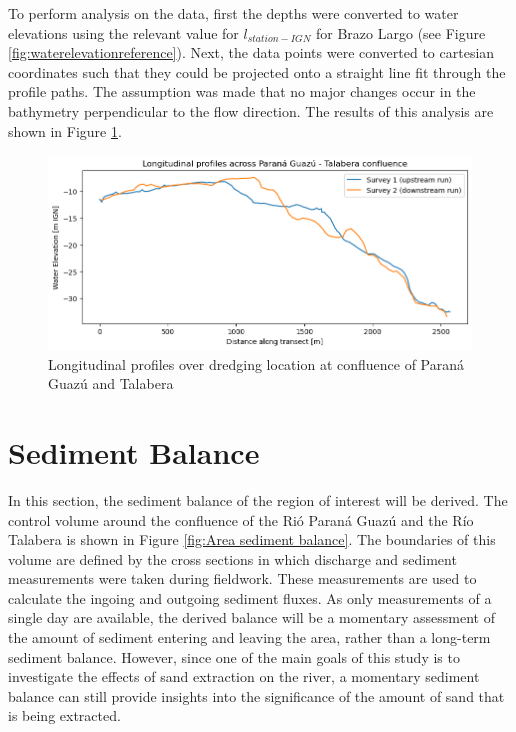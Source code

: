 To perform analysis on the data, first the depths were converted to water elevations using the relevant value for $l_{station-IGN}$ for Brazo Largo (see Figure \ref{fig:waterelevationreference}). Next, the data points were converted to cartesian coordinates such that they could be projected onto a straight line fit through the profile paths. The assumption was made that no major changes occur in the bathymetry perpendicular to the flow direction. The results of this analysis are shown in Figure \ref{fig:longitudinal profiles}. 

\begin{figure}[H]
    \centering
    \includegraphics[width=0.75\linewidth]{figures/ch6/longitudinal profiles.png}
    \caption{Longitudinal profiles over dredging location at confluence of Paraná Guazú and Talabera}
    \label{fig:longitudinal profiles}
\end{figure}


\newpage
\section{Sediment Balance}
\label{sec: Sediment Balance}
In this section, the sediment balance of the region of interest will be derived. The control volume around the confluence of the Rió Paraná Guazú and the Río Talabera is shown in Figure \ref{fig:Area sediment balance}. The boundaries of this volume are defined by the cross sections in which discharge and sediment measurements were taken during fieldwork. These measurements are used to calculate the ingoing and outgoing sediment fluxes. As only measurements of a single day are available, the derived balance will be a momentary assessment of the amount of sediment entering and leaving the area, rather than a long-term sediment balance. However, since one of the main goals of this study is to investigate the effects of sand extraction on the river, a momentary sediment balance can still provide insights into the significance of the amount of sand that is being extracted.

